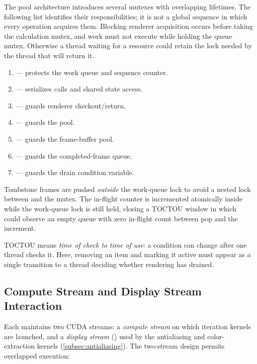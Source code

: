 The pool architecture introduces several mutexes with overlapping lifetimes.
The following list identifies their responsibilities; it is not a global sequence
in which every operation acquires them. Blocking renderer acquisition occurs before
taking the calculation mutex, and work must not execute while holding the queue
mutex. Otherwise a thread waiting for a resource could retain the lock needed by
the thread that will return it.
\begin{enumerate}
  \item {} --- protects the work queue and
        sequence counter.
  \item {} --- serializes
         calls and shared  state
        access.
  \item {} --- guards renderer
        checkout/return.
  \item {} --- guards the
         pool.
  \item {} --- guards the 
        frame-buffer pool.
  \item {} --- guards the
        completed-frame queue.
  \item {} --- guards the drain condition
        variable.
\end{enumerate}
Tombstone frames are pushed \emph{outside} the work-queue lock to
avoid a nested lock between  and the
 mutex.  The in-flight counter
 is incremented atomically inside
 while the work-queue lock is still held,
closing a TOCTOU window in which  could observe an
empty queue with zero in-flight count between pop and the
increment.

TOCTOU means \emph{time of check to time of use}: a condition can change after one
thread checks it. Here, removing an item and marking it active must appear as a
single transition to a thread deciding whether rendering has drained.

\subsection{Compute Stream and Display Stream Interaction}
\label{subsec:stream-interaction}

Each  maintains two CUDA streams: a
\emph{compute stream} on which iteration kernels are launched,
and a \emph{display stream} () used by the
antialiasing and color-extraction kernels
(\cref{subsec:antialiasing}).  The two-stream design permits
overlapped execution:

